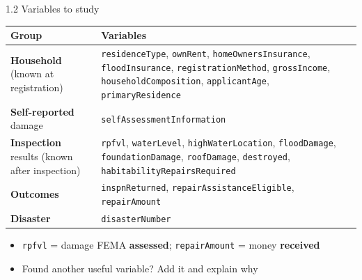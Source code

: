 \documentclass[aspectratio=43,11pt]{beamer}
\begin{document}
\begin{frame}{1.2 Variables to study}
  \footnotesize
  \begin{tabular}{@{}>{\raggedright\arraybackslash}p{}>{\raggedright\arraybackslash}p{}@{}}
    \toprule
    Group & Variables \\
    \midrule
    \textbf{Household} \newline (known at registration)
      & \texttt{residenceType}, \texttt{ownRent}, \texttt{homeOwnersInsurance},
        \texttt{floodInsurance}, \texttt{registrationMethod}, \texttt{grossIncome},
        \texttt{householdComposition}, \texttt{applicantAge}, \texttt{primaryResidence} \\[0.3em]
    \textbf{Self-reported} damage
      & \texttt{selfAssessmentInformation} \\[0.3em]
    \textbf{Inspection} results \newline (known after inspection)
      & \texttt{rpfvl}, \texttt{waterLevel}, \texttt{highWaterLocation},
        \texttt{floodDamage}, \texttt{foundationDamage}, \texttt{roofDamage},
        \texttt{destroyed}, \texttt{habitabilityRepairsRequired} \\[0.3em]
    \textbf{Outcomes}
      & \texttt{inspnReturned}, \texttt{repairAssistanceEligible}, \texttt{repairAmount} \\[0.3em]
    \textbf{Disaster}
      & \texttt{disasterNumber} \\
    \bottomrule
  \end{tabular}
  \vspace{0.8em}
  \normalsize
  \begin{itemize}
    \item \texttt{rpfvl} = damage FEMA \textbf{assessed};
          \texttt{repairAmount} = money \textbf{received}
    \item Found another useful variable? Add it and explain why
  \end{itemize}
\end{frame}
\end{document}
